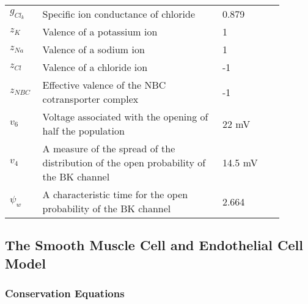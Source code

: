 \begin{table}[h!]
\centering
\begin{tabular}{ p{0.09\linewidth}  >{\footnotesize} p{0.6\linewidth}  >{\footnotesize} p{0.17\linewidth} >{\footnotesize} p{0.03\linewidth} }
\hline
$g_{Cl_k}$ 		& Specific ion conductance of chloride 									& 0.879 \perOhmm & \cite{Ostby2009}  \\
$z_K$			& Valence of a potassium ion										& 1   & \\ 
$z_{Na}$			& Valence of a sodium ion											& 1   & \\ 
$z_{Cl}$			& Valence of a chloride ion											& -1  & \\ 
$z_{NBC}$ 		& Effective valence of the NBC cotransporter complex 				& -1 & \\
$v_{6}$			& Voltage associated with the opening of half the population		& 22 mV  & \cite{GonzalezFernandez1994}  \\
$v_{4}$			& A measure of the spread of the distribution of the open probability of the BK channel	& 14.5 mV   &  \cite{GonzalezFernandez1994}  
\\
$ \psi_{w}$    	& A characteristic time for the open probability of the BK channel		& 2.664 \pers & \cite{GonzalezFernandez1994} \\
\hline
\end{tabular}
\end{table}

\subsection{The Smooth Muscle Cell and Endothelial Cell Model}\label{sec:EqSMCEC}

\subsubsection*{Conservation Equations}
